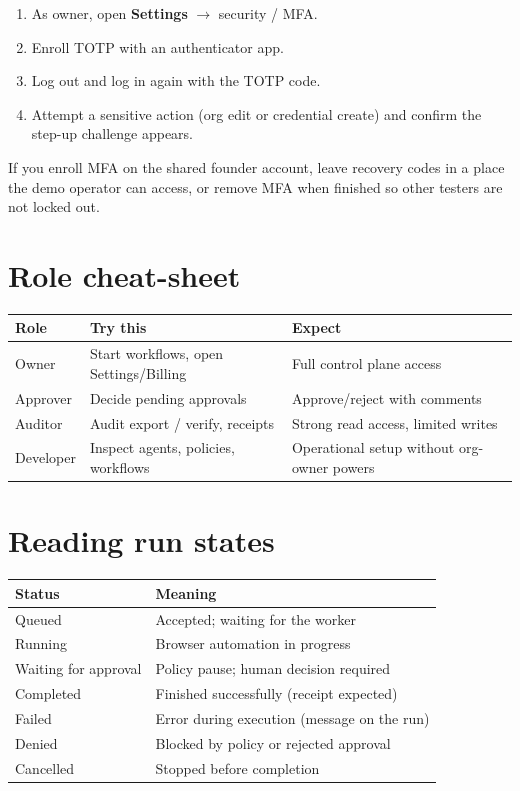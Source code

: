 \documentclass[11pt,a4paper]{article}
\newcommand{\ui}[1]{\textbf{#1}}
\begin{document}
\begin{enumerate}[leftmargin=1.3em]
  \item As owner, open \ui{Settings} $\rightarrow$ security / MFA.
  \item Enroll TOTP with an authenticator app.
  \item Log out and log in again with the TOTP code.
  \item Attempt a sensitive action (org edit or credential create) and confirm
        the step-up challenge appears.
\end{enumerate}

\begin{callout}[Courtesy]
  If you enroll MFA on the shared founder account, leave recovery codes in a
  place the demo operator can access, or remove MFA when finished so other
  testers are not locked out.
\end{callout}

\section{Role cheat-sheet}

\begin{tabularx}{\textwidth}{@{}l X X@{}}
  \toprule
  \textbf{Role} & \textbf{Try this} & \textbf{Expect} \\
  \midrule
  Owner & Start workflows, open Settings/Billing & Full control plane access \\
  Approver & Decide pending approvals & Approve/reject with comments \\
  Auditor & Audit export / verify, receipts & Strong read access, limited writes \\
  Developer & Inspect agents, policies, workflows & Operational setup without org-owner powers \\
  \bottomrule
\end{tabularx}

\section{Reading run states}

\begin{tabularx}{\textwidth}{@{}l X@{}}
  \toprule
  \textbf{Status} & \textbf{Meaning} \\
  \midrule
  Queued & Accepted; waiting for the worker \\
  Running & Browser automation in progress \\
  Waiting for approval & Policy pause; human decision required \\
  Completed & Finished successfully (receipt expected) \\
  Failed & Error during execution (message on the run) \\
  Denied & Blocked by policy or rejected approval \\
  Cancelled & Stopped before completion \\
  \bottomrule
\end{tabularx}
\end{document}
